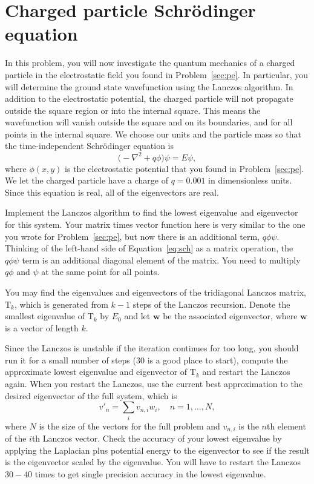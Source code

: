 \section{Charged particle Schrödinger equation}

In this problem, you will now investigate the quantum mechanics of a charged particle in the
electrostatic field you found in Problem~\ref{sec:pe}. In particular, you will determine the
ground state wavefunction using the Lanczos algorithm. In addition to the electrostatic
potential, the charged particle will not propagate outside the square region or into the
internal square. This means the wavefunction will vanish outside the square and on its
boundaries, and for all points in the internal square. We choose our units and the particle
mass so that the time-independent Schrödinger equation is
%
\begin{equation}\label{eq:sch}
    \bigl( -\nabla^2 + q \phi \bigr) \psi = E \psi,
\end{equation}
%
where \(\phi(x, y)\) is the electrostatic potential that you found in Problem~\ref{sec:pe}.
We let the charged particle have a charge of \(q = 0.001\) in dimensionless units. Since
this equation is real, all of the eigenvectors are real.

Implement the Lanczos algorithm to find the lowest eigenvalue and eigenvector for this
system. Your matrix times vector function here is very similar to the one you wrote for
Problem~\ref{sec:pe}, but now there is an additional term, \(q \phi \psi\).
Thinking of the left-hand side of Equation~\eqref{eq:sch}
as a matrix operation, the \(q \phi \psi\) term is an additional diagonal element of the
matrix. You need to multiply \(q \phi\) and \(\psi\) at the same point for all points.

You may find the eigenvalues and eigenvectors of the tridiagonal Lanczos matrix, \(\mathrm{T}_k\),
which is generated from \(k - 1\) steps of the Lanczos recursion. Denote the smallest
eigenvalue of \(\mathrm{T}_k\) by \(E_0\) and let \(\bm{w}\) be the associated eigenvector, 
where \(\bm{w}\) is a vector of length \(k\).

Since the Lanczos is unstable if the iteration continues for too long, you should run it for
a small number of steps (\(30\) is a good place to start), compute the approximate lowest
eigenvalue and eigenvector of \(\mathrm{T}_k\) and restart the Lanczos again. When you restart the
Lanczos, use the current best approximation to the desired eigenvector of the full system,
which is
%
\begin{equation}\label{eq:restart}
    v'_n = \sum_i v_{n,i} w_i, \quad n = 1, \ldots, N,
\end{equation}
%
where \(N\) is the size of the vectors for the full problem and \(v_{n, i}\) is the
\(n\)th element of the \(i\)th
Lanczos vector. Check the accuracy of your lowest eigenvalue by applying the Laplacian plus
potential energy to the eigenvector to see if the result is the eigenvector scaled by the
eigenvalue. You will have to restart the Lanczos \(30 - 40\) times to get single precision
accuracy in the lowest eigenvalue.

